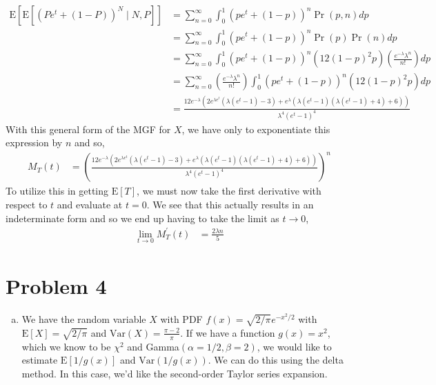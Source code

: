 \documentclass[11pt]{article}
\begin{document}
\begin{enumerate}[(a)]
\begin{align*}
  \mathrm{E}[\mathrm{E}[(Pe^t + (1-P))^N \mid N,P]] &=
  \sum_{n=0}^{\infty} \int_0^1 (pe^t+(1-p))^n
  \Pr{(p,n)} dp \\
  &= \sum_{n=0}^{\infty} \int_0^1 (pe^t+(1-p))^n \Pr{(p)} \Pr{(n)} dp \\
  &= \sum_{n=0}^{\infty} \int_0^1 (pe^t+(1-p))^n \left( 12(1-p)^2 p
  \right) \left(
    \frac{e^{-\lambda} \lambda^n}{n!} \right) dp \\
  &= \sum_{n=0}^{\infty} \left( \frac{e^{-\lambda} \lambda^n}{n!}
  \right)
  \int_0^1 (pe^t+(1-p))^n \left( 12(1-p)^2 p \right)  dp \\
  &= \frac{12 e^{-\lambda } \left(2 e^{\lambda e^t} \left(\lambda
        \left(e^t-1\right)-3\right)+e^{\lambda } \left(\lambda
        \left(e^t-1\right) \left(\lambda
          \left(e^t-1\right)+4\right)+6\right)\right)}{\lambda^4
    \left(e^t-1\right)^4}
\end{align*}
With this general form of the MGF for $X$, we have only to
exponentiate this expression by $n$ and so,
\begin{align*}
  M_T(t) &= \left( \frac{12 e^{-\lambda } \left(2 e^{\lambda  e^t}
           \left(\lambda \left(e^t-1\right)-3\right)+e^{\lambda}
           \left(\lambda \left(e^t-1\right) \left(\lambda
           \left(e^t-1\right)+4\right)+6\right)\right)}{\lambda^4
           \left(e^t-1\right)^4} \right)^n
\end{align*}
To utilize this in getting $\mathrm{E}[T]$, we must now take the first
derivative with respect to $t$ and evaluate at $t=0$.  We see that
this actually results in an indeterminate form and so we end up having
to take the limit as $t \rightarrow 0$,
\begin{align*}
  \lim_{t \rightarrow 0} M_T^{'}(t) &= \frac{2\lambda n}{5}
\end{align*}

\newpage

\section*{Problem 4}

\begin{enumerate}[(a)]
  \item We have the random variable $X$ with PDF $f(x) = \sqrt{2/\pi}
    e^{-x^2/2}$ with $\mathrm{E}[X] = \sqrt{2/\pi}$ and
    $\mathrm{Var}(X) = \frac{\pi-2}{\pi}$.  If we have a function
    $g(x) = x^2$, which we know to be $\chi^2$ and
    Gamma$(\alpha=1/2,\beta=2)$, we would like to estimate
    $\mathrm{E}[1/g(x)]$ and $\mathrm{Var}(1/g(x))$.  We can do this
    using the delta method.  In this case, we'd like the second-order
    Taylor series expansion.


\end{enumerate}
\end{enumerate}
\end{document}
